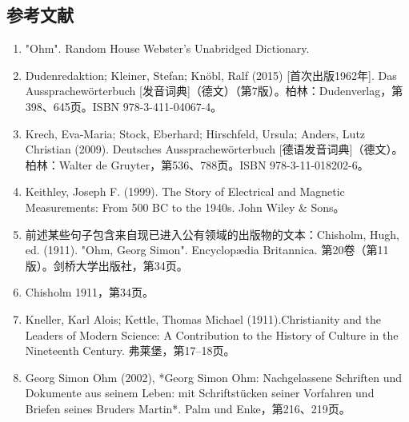 \subsection{参考文献}  
\begin{enumerate}
\item "Ohm". Random House Webster's Unabridged Dictionary.  
\item Dudenredaktion; Kleiner, Stefan; Knöbl, Ralf (2015) [首次出版1962年]. Das Aussprachewörterbuch [发音词典]（德文）（第7版）。柏林：Dudenverlag，第398、645页。ISBN 978-3-411-04067-4。  
\item Krech, Eva-Maria; Stock, Eberhard; Hirschfeld, Ursula; Anders, Lutz Christian (2009). Deutsches Aussprachewörterbuch [德语发音词典]（德文）。柏林：Walter de Gruyter，第536、788页。ISBN 978-3-11-018202-6。  
\item Keithley, Joseph F. (1999). The Story of Electrical and Magnetic Measurements: From 500 BC to the 1940s. John Wiley & Sons。  
\item 前述某些句子包含来自现已进入公有领域的出版物的文本：Chisholm, Hugh, ed. (1911). "Ohm, Georg Simon". Encyclopædia Britannica. 第20卷（第11版）。剑桥大学出版社，第34页。  
\item Chisholm 1911，第34页。  
\item Kneller, Karl Alois; Kettle, Thomas Michael (1911).Christianity and the Leaders of Modern Science: A Contribution to the History of Culture in the Nineteenth Century. 弗莱堡，第17–18页。  
\item Georg Simon Ohm (2002), *Georg Simon Ohm: Nachgelassene Schriften und Dokumente aus seinem Leben: mit Schriftstücken seiner Vorfahren und Briefen seines Bruders Martin*. Palm und Enke，第216、219页。
\end{enumerate}